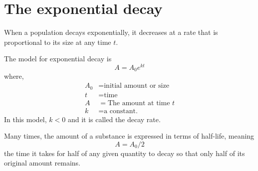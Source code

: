 \section{The exponential decay}
When a population decays exponentially, it decreases at a rate that is proportional to 
its size at any time $t$.
	\begin{tcolorbox}[title=The exponential decay, fonttitle=\bfseries,
	                  colframe=blue!70!black,
	                  colback=white]
		The model for exponential decay is 
		\begin{equation}
				A=A_0e^{kt} \label{exp_decay}	
		\end{equation}
		where,
		\begin{align*}
			A_0&= \text{initial amount or size}\\
			t &=  \text{time} \\
			A &= \text{The amount at time $t$}\\
			k &= \text{a constant.}
		\end{align*}
		In this model, $k<0$ and it is called the decay rate.
	\end{tcolorbox}
\begin{nt}
Many times, the amount of a substance is expressed in terms of half-life, meaning
	\[ 
		A=A_0/2
	\]
the time it takes for half of any given quantity to decay so that only half of its 
original amount remains. 
\end{nt}
